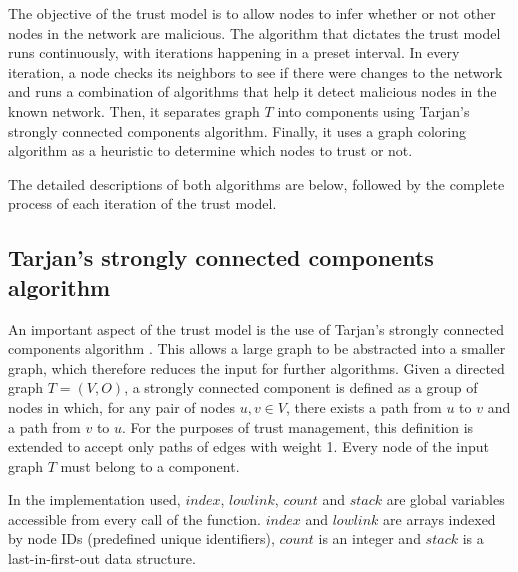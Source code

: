 \documentclass[conference]{IEEEtran}
\begin{document}
The objective of the trust model is to allow nodes to infer whether or not other nodes in the network are malicious.
The algorithm that dictates the trust model runs continuously, with iterations happening in a preset interval.
In every iteration, a node checks its neighbors to see if there were changes to the network and runs a combination of algorithms that help it detect malicious nodes in the known network.
Then, it separates graph $T$ into components using Tarjan's strongly connected components algorithm.
Finally, it uses a graph coloring algorithm as a heuristic to determine which nodes to trust or not.



The detailed descriptions of both algorithms are below, followed by the complete process of each iteration of the trust model.

\subsection{Tarjan's strongly connected components algorithm}
\label{section:tarjan}
An important aspect of the trust model is the use of Tarjan's strongly connected components algorithm \cite{tarjan1972depth}.
This allows a large graph to be abstracted into a smaller graph, which therefore reduces the input for further algorithms.
Given a directed graph $T = (V,O)$, a strongly connected component is defined as a group of nodes in which, for any pair of nodes $u, v \in V$, there exists a path from $u$ to $v$ and a path from $v$ to $u$.
For the purposes of trust management, this definition is extended to accept only paths of edges with weight 1.
Every node of the input graph $T$ must belong to a component.

In the implementation used, $index$, $lowlink$, $count$ and $stack$ are global variables accessible from every call of the function.
$index$ and $lowlink$ are arrays indexed by node IDs (predefined unique identifiers), $count$ is an integer and $stack$ is a last-in-first-out data structure.
\end{document}
